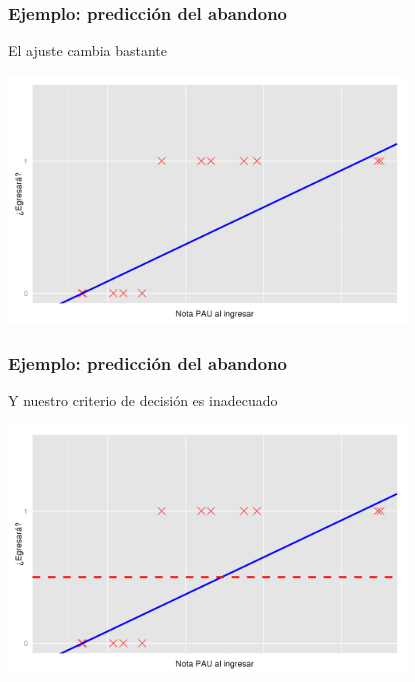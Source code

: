 \documentclass{beamer}
\begin{document}
 \begin{frame}\frametitle{Ejemplo: predicción del abandono}
   \begin{overlayarea}{\textwidth}{0.6cm} 
   El ajuste cambia bastante
   \end{overlayarea}
   \begin{center}
  \includegraphics[height=6.6cm]{egresara10.png}
\end{center}

 \end{frame}
 \begin{frame}\frametitle{Ejemplo: predicción del abandono}
   \begin{overlayarea}{\textwidth}{0.6cm} 
   Y nuestro criterio de decisión es inadecuado
   \end{overlayarea}
   \begin{center}
  \includegraphics[height=6.6cm]{egresara11.png}
\end{center}

 \end{frame}
\end{document}
